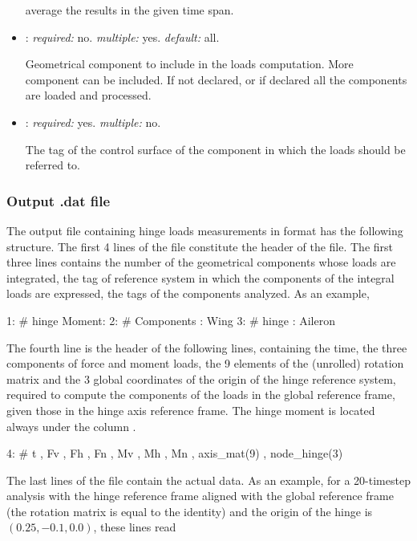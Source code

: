 \begin{itemize}
average the results in the given time span.

\item {}: \textit{required:} no. \textit{multiple:} yes. \textit{default:} all.

Geometrical component to include in the loads computation. More component can be included. 
If not declared, or if declared  all the components are loaded and processed. 

\item {}: \textit{required:} yes. \textit{multiple:} no.

The tag of the control surface of the component in which the loads should be referred to. 

\end{itemize}

\subsubsection{Output .dat file}
The output file containing hinge loads measurements in  
format has the following structure.
The first 4 lines of the file constitute the header of the file. 
The first three lines contains the number of the geometrical components 
 whose loads are integrated, the tag of reference system 
in which the components of the integral loads are expressed, the tags of 
the  components analyzed. As an example,
\begin{inputfile}
 1: # hinge Moment: 
 2: #               Components  : Wing
 3: #                    hinge  : Aileron
\end{inputfile}
The fourth line is the header of the following lines, containing the time, 
the three components of force and moment loads, the 9 elements of the (unrolled) 
rotation matrix and the 3 global coordinates of the origin of the hinge reference 
system, required to compute the components of the loads in the global reference 
frame, given those in the hinge axis reference frame. The hinge moment is located 
always under the column . 
\begin{inputfile}
 4: #  t , Fv , Fh , Fn , Mv , Mh , Mn , axis_mat(9) , node_hinge(3) 
\end{inputfile}
The last lines of the file contain the actual data. As an example, 
for a 20-timestep analysis with the hinge  reference frame  
aligned with the global reference frame (the rotation matrix is equal to the identity)
and the origin of the hinge is $(0.25,-0.1,0.0)$, these lines read
